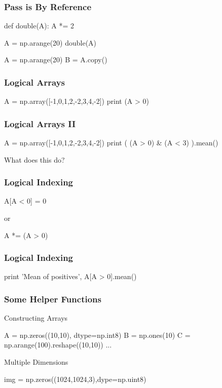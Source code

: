 \begin{frame}[fragile]
\frametitle{Pass is By Reference}

\begin{python}
def double(A):
    A *= 2

A = np.arange(20)
double(A)
\end{python}
\pause
\begin{python}
A = np.arange(20)
B = A.copy()
\end{python}
\end{frame}

\begin{frame}[fragile]
\frametitle{Logical Arrays}
\begin{python}
A = np.array([-1,0,1,2,-2,3,4,-2])
print (A > 0)
\end{python}
\end{frame}
\begin{frame}[fragile]
\frametitle{Logical Arrays II}
\begin{python}
A = np.array([-1,0,1,2,-2,3,4,-2])
print ( (A > 0) & (A < 3) ).mean()
\end{python}

What does this do?
\end{frame}

\begin{frame}[fragile]
\frametitle{Logical Indexing}
\begin{python}
A[A < 0] = 0
\end{python}
or
\begin{python}
A *= (A > 0)
\end{python}
\end{frame}


\begin{frame}[fragile]
\frametitle{Logical Indexing}

\begin{python}
print 'Mean of positives', A[A > 0].mean()
\end{python}
\end{frame}

\begin{frame}[fragile]
\frametitle{Some Helper Functions}

\begin{block}{Constructing Arrays}
\begin{python}
A = np.zeros((10,10), dtype=np.int8)
B = np.ones(10)
C = np.arange(100).reshape((10,10))
...
\end{python}
\end{block}

\begin{block}{Multiple Dimensions}
\begin{python}
img = np.zeros((1024,1024,3),dype=np.uint8)
\end{python}
\end{block}

\end{frame}



